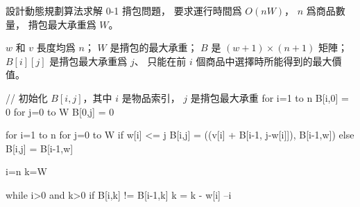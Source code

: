 \startEXERCISE[exercise:16.2-2]
設計動態規劃算法求解 0-1 揹包問題，
要求運行時間爲 $O(nW)$， $n$ 爲商品數量，
揹包最大承重爲 $W$。
\stopEXERCISE

\startANSWER
$w$ 和 $v$ 長度均爲 $n$；
 $W$ 是揹包的最大承重；
 $B$ 是 $(w+1)\times(n+1)$ 矩陣；
 $B[i][j]$ 是揹包最大承重爲 $j$、
只能在前 $i$ 個商品中選擇時所能得到的最大價值。

\startCLRSCODE
// 初始化 $B[i,j]$，其中 $i$ 是物品索引， $j$ 是揹包最大承重
for i=1 to n
	B[i,0] = 0
for j=0 to W
	B[0,j] = 0

for i=1 to n
	for j=0 to W
		if w[i] <= j
			B[i,j] = \max((v[i] + B[i-1, j-w[i]]), B[i-1,w])
		else
			B[i,j] = B[i-1,w]
\stopCLRSCODE

\startCLRSCODE
i=n
k=W

while i>0 and k>0
	if B[i,k] != B[i-1,k]
		k = k - w[i]
	--i
\stopCLRSCODE

\stopANSWER
